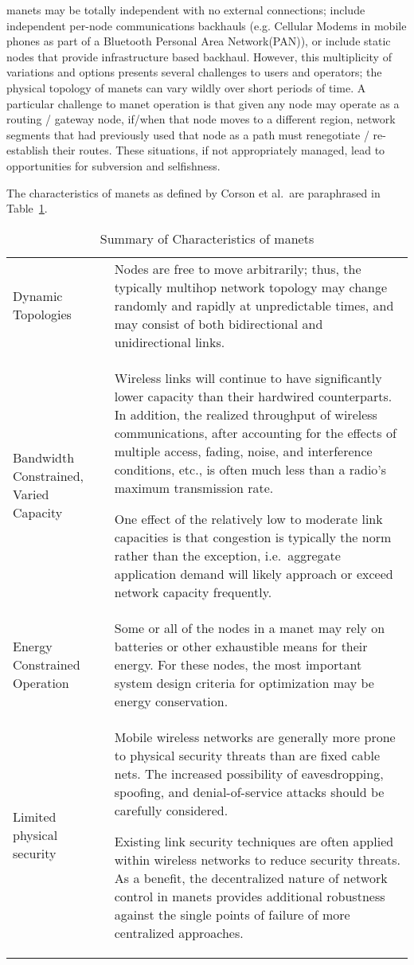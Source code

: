 \glspl{manet} may be totally independent with no external connections; include independent per-node communications backhauls (e.g. Cellular Modems in mobile phones as part of a Bluetooth Personal Area Network(PAN)), or include static nodes that provide infrastructure based backhaul.
However, this multiplicity of variations and options presents several challenges to users and operators; the physical topology of \glspl{manet} can vary wildly over short periods of time.
A particular challenge to \gls{manet} operation is that given any node may operate as a routing / gateway node, if/when that node moves to a different region, network segments that had previously used that node as a path must renegotiate / re-establish their routes.
These situations, if not appropriately managed, lead to opportunities for subversion and selfishness.

The characteristics of \gls{manet}s as defined by Corson et al.\ are paraphrased in Table~\ref{tab:manet_characteristics}.

\begin{table}
\caption[Summary of Characteristics of \gls{manet}s]{Summary of Characteristics of \gls{manet}s\cite{Corson1999}}
\label{tab:manet_characteristics}
  \begin{tabularx}{\textwidth}{p{2cm}X}\toprule
    Dynamic Topologies & Nodes are free to move arbitrarily; thus, the typically multihop network topology may change randomly and rapidly at unpredictable times, and may consist of both bidirectional and unidirectional links.
\\
    Bandwidth Constrained, Varied Capacity & Wireless links will continue to have significantly lower capacity than their hardwired counterparts.
In addition, the realized throughput of wireless communications, after accounting for the effects of multiple access, fading, noise, and interference conditions, etc., is often much less than a radio's maximum transmission rate.
\par
One effect of the relatively low to moderate link capacities is that congestion is typically the norm rather than the exception, i.e.\  aggregate application demand will likely approach or exceed network capacity frequently.\\
    Energy Constrained Operation &  Some or all of the nodes in a \gls{manet} may rely on batteries or other exhaustible means for their energy.
For these nodes, the most important system design criteria for optimization may be energy conservation.\\
    Limited physical security & Mobile wireless networks are generally more prone to physical security threats than are fixed cable nets.
The increased possibility of eavesdropping, spoofing, and denial-of-service attacks should be carefully considered.\par
Existing link security techniques are often applied within wireless networks to reduce security threats.
As a benefit, the decentralized nature of network control in \glspl{manet} provides additional robustness against the single points of failure of more centralized approaches.\\\bottomrule
\end{tabularx}
\end{table}

